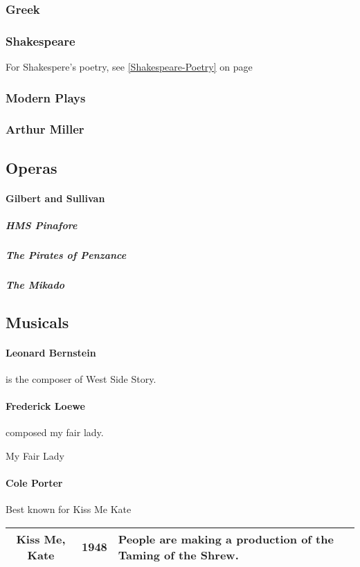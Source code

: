 			\subsubsection{Greek}
			\subsubsection{Shakespeare} \label{Shakespeare-Play} For Shakespere's poetry, see \ref{Shakespeare-Poetry} on page 
			\subsubsection{Modern Plays}
			\subsubsection{Arthur Miller}
			
			
		\subsection{Operas}
		
		
		
		\paragraph{Gilbert and Sullivan}
			\subparagraph{HMS Pinafore}
			\subparagraph{The Pirates of Penzance}
			\subparagraph{The Mikado}
\newpage
		\subsection{Musicals}
		\paragraph{Leonard Bernstein} is the composer of West Side Story.  
		



		\paragraph {Frederick Loewe} composed my fair lady.
		
		My Fair Lady

		\paragraph{Cole Porter}
		Best known for Kiss Me Kate
			\begin{longtable}{|c|c|p{3in}|}
	
	
				\hline
				Kiss Me, Kate & 1948 & People are making a production of the Taming of the Shrew.  \\
				\hline
	
	
	
	
\end{longtable}
